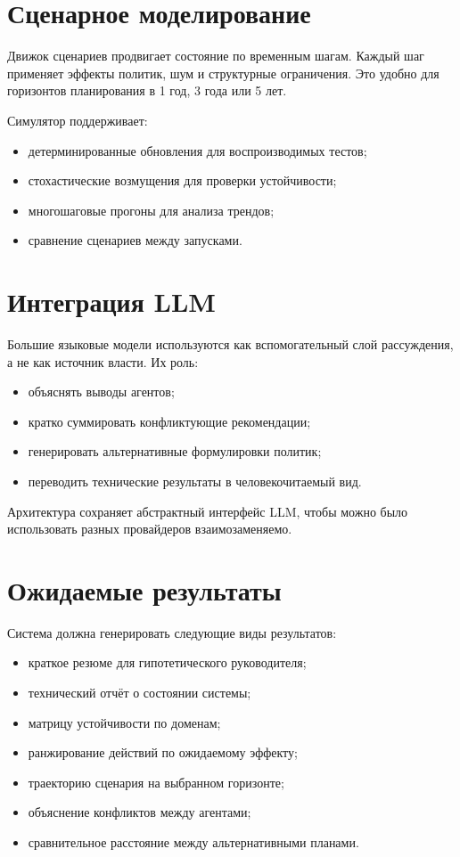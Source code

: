 \documentclass[11pt,a4paper]{article}
\begin{document}
\section{Сценарное моделирование}

Движок сценариев продвигает состояние по временным шагам. Каждый шаг применяет эффекты политик, шум и структурные ограничения. Это удобно для горизонтов планирования в 1 год, 3 года или 5 лет.

Симулятор поддерживает:
\begin{itemize}[leftmargin=1.5em]
    \item детерминированные обновления для воспроизводимых тестов;
    \item стохастические возмущения для проверки устойчивости;
    \item многошаговые прогоны для анализа трендов;
    \item сравнение сценариев между запусками.
\end{itemize}

\section{Интеграция LLM}

Большие языковые модели используются как вспомогательный слой рассуждения, а не как источник власти. Их роль:

\begin{itemize}[leftmargin=1.5em]
    \item объяснять выводы агентов;
    \item кратко суммировать конфликтующие рекомендации;
    \item генерировать альтернативные формулировки политик;
    \item переводить технические результаты в человекочитаемый вид.
\end{itemize}

Архитектура сохраняет абстрактный интерфейс LLM, чтобы можно было использовать разных провайдеров взаимозаменяемо.

\section{Ожидаемые результаты}

Система должна генерировать следующие виды результатов:

\begin{itemize}[leftmargin=1.5em]
    \item краткое резюме для гипотетического руководителя;
    \item технический отчёт о состоянии системы;
    \item матрицу устойчивости по доменам;
    \item ранжирование действий по ожидаемому эффекту;
    \item траекторию сценария на выбранном горизонте;
    \item объяснение конфликтов между агентами;
    \item сравнительное расстояние между альтернативными планами.
\end{itemize}
\end{document}
